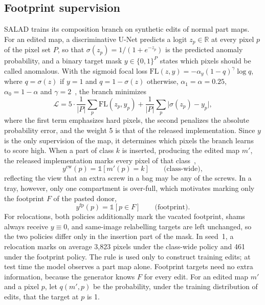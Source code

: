 \subsection{Footprint supervision}
\label{sec:targets}
SALAD trains its composition branch on synthetic edits of normal part maps. For an edited map, a discriminative U-Net predicts a logit $z_p\in\mathbb{R}$ at every pixel $p$ of the pixel set $P$, so that $\sigma(z_p)=1/(1+e^{-z_p})$ is the predicted anomaly probability, and a binary target mask $y\in\{0,1\}^{P}$ states which pixels should be called anomalous. With the sigmoid focal loss $\mathrm{FL}(z,y)=-\alpha_y(1-q)^{\gamma}\log q$, where $q=\sigma(z)$ if $y=1$ and $q=1-\sigma(z)$ otherwise, $\alpha_1=\alpha=0.25$, $\alpha_0=1-\alpha$ and $\gamma=2$~\cite{lin2017focal}, the branch minimizes
\begin{equation}
 \mathcal{L}=5\cdot\frac{1}{|P|}\sum_p \mathrm{FL}(z_p,y_p)+\frac{1}{|P|}\sum_p\bigl|\sigma(z_p)-y_p\bigr|,
 \label{eq:loss}
\end{equation}
where the first term emphasizes hard pixels, the second penalizes the absolute probability error, and the weight 5 is that of the released implementation. Since $y$ is the only supervision of the map, it determines which pixels the branch learns to score high. When a part of class $k$ is inserted, producing the edited map $m'$, the released implementation marks every pixel of that class~\cite{fucka2025},
\begin{equation}
 y^{\text{cw}}(p)=\mathbb{1}[m'(p)=k]\qquad\text{(class-wide)},
\end{equation}
reflecting the view that an extra screw in a bag may be any of the screws. In a tray, however, only one compartment is over-full, which motivates marking only the footprint $F$ of the pasted donor,
\begin{equation}
 y^{\text{fp}}(p)=\mathbb{1}[p\in F]\qquad\text{(footprint)}.
\end{equation}
For relocations, both policies additionally mark the vacated footprint, shams always receive $y\equiv0$, and same-image relabelling targets are left unchanged, so the two policies differ only in the insertion part of the mask. In seed~1, a relocation marks on average 3,823 pixels under the class-wide policy and 461 under the footprint policy. The rule is used only to construct training edits; at test time the model observes a part map alone. Footprint targets need no extra information, because the generator knows $F$ for every edit. For an edited map $m'$ and a pixel $p$, let $q(m',p)$ be the probability, under the training distribution of edits, that the target at $p$ is 1.

